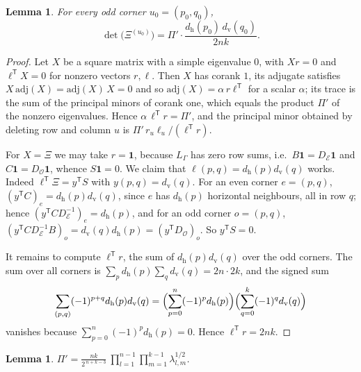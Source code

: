 \documentclass[11pt,a4paper]{amsart}
\newtheorem{lemma}[theorem]{Lemma}
\theoremstyle{remark}
\newcommand{\G}{\Gamma}
\newcommand{\dvv}{d_{\mathrm v}}
\newcommand{\dhh}{d_{\mathrm h}}
\begin{document}
\begin{lemma}\label{lem:adj}
For every odd corner $u_0=(p_0,q_0)$,
\[ \det\bigl(\Xi^{(u_0)}\bigr)=\Pi'\cdot\frac{\dhh(p_0)\,\dvv(q_0)}{2nk}. \]
\end{lemma}

\begin{proof}
Let $X$ be a square matrix with a simple eigenvalue $0$, with $Xr=0$ and $\ell^{\mathsf T}X=0$ for nonzero vectors
$r,\ell$. Then $X$ has corank $1$, its adjugate satisfies $X\,\mathrm{adj}(X)=\mathrm{adj}(X)\,X=0$ and so
$\mathrm{adj}(X)=\alpha\,r\ell^{\mathsf T}$ for a scalar $\alpha$; its trace is the sum of the principal minors
of corank one, which equals the product $\Pi'$ of the nonzero eigenvalues. Hence
$\alpha\,\ell^{\mathsf T}r=\Pi'$, and the principal minor obtained by deleting row and column $u$ is
$\Pi'\,r_u\ell_u/(\ell^{\mathsf T}r)$.

For $X=\Xi$ we may take $r=\mathbf 1$, because $L_\G$ has zero row sums, i.e.\ $B\mathbf 1=D_{\mathcal E}\mathbf 1$
and $C\mathbf 1=D_{\mathcal O}\mathbf 1$, whence $S\mathbf 1=0$. We claim that $\ell(p,q)=\dhh(p)\dvv(q)$ works.
Indeed $\ell^{\mathsf T}\Xi=y^{\mathsf T}S$ with $y(p,q)=\dvv(q)$. For an even corner $e=(p,q)$,
$(y^{\mathsf T}C)_e=\dhh(p)\dvv(q)$, since $e$ has $\dhh(p)$ horizontal neighbours, all in row $q$; hence
$(y^{\mathsf T}CD_{\mathcal E}^{-1})_e=\dhh(p)$, and for an odd corner $o=(p,q)$,
$(y^{\mathsf T}CD_{\mathcal E}^{-1}B)_o=\dvv(q)\dhh(p)=(y^{\mathsf T}D_{\mathcal O})_o$. So $y^{\mathsf T}S=0$.

It remains to compute $\ell^{\mathsf T}r$, the sum of $\dhh(p)\dvv(q)$ over the odd corners. The sum over all
corners is $\sum_p\dhh(p)\sum_q\dvv(q)=2n\cdot 2k$, and the signed sum
\[ \sum_{(p,q)}(-1)^{p+q}\dhh(p)\dvv(q)=\Bigl(\sum_{p=0}^{n}(-1)^p\dhh(p)\Bigr)\Bigl(\sum_{q=0}^{k}(-1)^q\dvv(q)\Bigr) \]
vanishes because $\sum_{p=0}^{n}(-1)^p\dhh(p)=0$. Hence $\ell^{\mathsf T}r=2nk$.
\end{proof}

\begin{lemma}\label{lem:trig}
$\displaystyle \Pi'=\frac{nk}{2^{\,n+k-3}}\ \prod_{l=1}^{n-1}\prod_{m=1}^{k-1}\lambda_{l,m}^{1/2}$.
\end{lemma}
\end{document}
